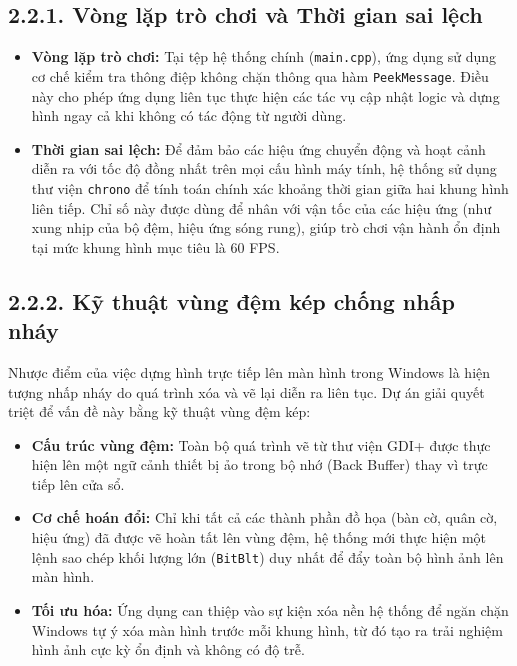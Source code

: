 \subsection*{2.2.1. Vòng lặp trò chơi và Thời gian sai lệch}

\begin{itemize}
    \item \textbf{Vòng lặp trò chơi:} Tại tệp hệ thống chính (\texttt{main.cpp}), ứng dụng sử dụng cơ chế kiểm tra thông điệp không chặn thông qua hàm \texttt{PeekMessage}. Điều này cho phép ứng dụng liên tục thực hiện các tác vụ cập nhật logic và dựng hình ngay cả khi không có tác động từ người dùng.
    \item \textbf{Thời gian sai lệch:} Để đảm bảo các hiệu ứng chuyển động và hoạt cảnh diễn ra với tốc độ đồng nhất trên mọi cấu hình máy tính, hệ thống sử dụng thư viện \texttt{chrono} để tính toán chính xác khoảng thời gian giữa hai khung hình liên tiếp. Chỉ số này được dùng để nhân với vận tốc của các hiệu ứng (như xung nhịp của bộ đệm, hiệu ứng sóng rung), giúp trò chơi vận hành ổn định tại mức khung hình mục tiêu là 60 FPS.
\end{itemize}

\subsection*{2.2.2. Kỹ thuật vùng đệm kép chống nhấp nháy}

\noindent \indent Nhược điểm của việc dựng hình trực tiếp lên màn hình trong Windows là hiện tượng nhấp nháy do quá trình xóa và vẽ lại diễn ra liên tục. Dự án giải quyết triệt để vấn đề này bằng kỹ thuật vùng đệm kép:

\begin{itemize}
    \item \textbf{Cấu trúc vùng đệm:} Toàn bộ quá trình vẽ từ thư viện GDI+ được thực hiện lên một ngữ cảnh thiết bị ảo trong bộ nhớ (Back Buffer) thay vì trực tiếp lên cửa sổ.
    \item \textbf{Cơ chế hoán đổi:} Chỉ khi tất cả các thành phần đồ họa (bàn cờ, quân cờ, hiệu ứng) đã được vẽ hoàn tất lên vùng đệm, hệ thống mới thực hiện một lệnh sao chép khối lượng lớn (\texttt{BitBlt}) duy nhất để đẩy toàn bộ hình ảnh lên màn hình. 
    \item \textbf{Tối ưu hóa:} Ứng dụng can thiệp vào sự kiện xóa nền hệ thống để ngăn chặn Windows tự ý xóa màn hình trước mỗi khung hình, từ đó tạo ra trải nghiệm hình ảnh cực kỳ ổn định và không có độ trễ.
\end{itemize}

